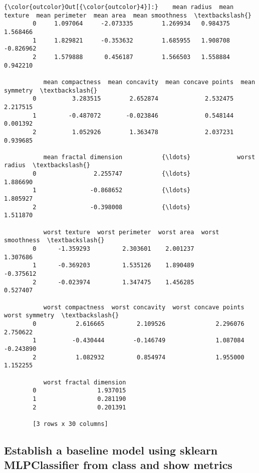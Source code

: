 \documentclass[11pt]{article}
\begin{document}
\begin{Verbatim}[commandchars=\\\{\}]
{\color{outcolor}Out[{\color{outcolor}4}]:}    mean radius  mean texture  mean perimeter  mean area  mean smoothness  \textbackslash{}
        0     1.097064     -2.073335        1.269934   0.984375         1.568466   
        1     1.829821     -0.353632        1.685955   1.908708        -0.826962   
        2     1.579888      0.456187        1.566503   1.558884         0.942210   
        
           mean compactness  mean concavity  mean concave points  mean symmetry  \textbackslash{}
        0          3.283515        2.652874             2.532475       2.217515   
        1         -0.487072       -0.023846             0.548144       0.001392   
        2          1.052926        1.363478             2.037231       0.939685   
        
           mean fractal dimension           {\ldots}             worst radius  \textbackslash{}
        0                2.255747           {\ldots}                 1.886690   
        1               -0.868652           {\ldots}                 1.805927   
        2               -0.398008           {\ldots}                 1.511870   
        
           worst texture  worst perimeter  worst area  worst smoothness  \textbackslash{}
        0      -1.359293         2.303601    2.001237          1.307686   
        1      -0.369203         1.535126    1.890489         -0.375612   
        2      -0.023974         1.347475    1.456285          0.527407   
        
           worst compactness  worst concavity  worst concave points  worst symmetry  \textbackslash{}
        0           2.616665         2.109526              2.296076        2.750622   
        1          -0.430444        -0.146749              1.087084       -0.243890   
        2           1.082932         0.854974              1.955000        1.152255   
        
           worst fractal dimension  
        0                 1.937015  
        1                 0.281190  
        2                 0.201391  
        
        [3 rows x 30 columns]
\end{Verbatim}
            
    \subsection{Establish a baseline model using sklearn MLPClassifier from
class and show
metrics}\label{establish-a-baseline-model-using-sklearn-mlpclassifier-from-class-and-show-metrics}
\end{document}
